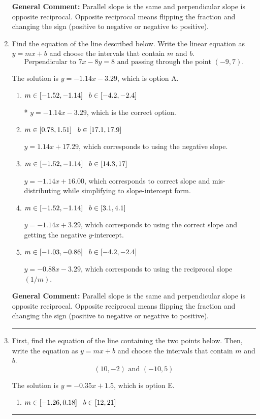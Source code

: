 \documentclass{extbook}[14pt]
\newcommand{\litem}[1]{\item #1

\rule{\textwidth}{0.4pt}}
\begin{document}
\begin{enumerate}
{\textbf{General Comment:} Parallel slope is the same and perpendicular slope is opposite reciprocal. Opposite reciprocal means flipping the fraction and changing the sign (positive to negative or negative to positive).
}
\litem{
Find the equation of the line described below. Write the linear equation as $ y=mx+b $ and choose the intervals that contain $m$ and $b$.
\[ \text{Perpendicular to } 7 x - 8 y = 8 \text{ and passing through the point } (-9, 7). \]

The solution is \( y = -1.14x - 3.29 \), which is option A.\begin{enumerate}[label=\Alph*.]
\item \( m \in [-1.52, -1.14] \hspace*{3mm} b \in [-4.2, -2.4] \)

* $y = -1.14x - 3.29$, which is the correct option.
\item \( m \in [0.78, 1.51] \hspace*{3mm} b \in [17.1, 17.9] \)

 $y = 1.14x + 17.29$, which corresponds to using the negative slope.
\item \( m \in [-1.52, -1.14] \hspace*{3mm} b \in [14.3, 17] \)

 $y = -1.14x + 16.00$, which corresponds to correct slope and mis-distributing while simplifying to slope-intercept form.
\item \( m \in [-1.52, -1.14] \hspace*{3mm} b \in [3.1, 4.1] \)

 $y = -1.14x + 3.29$, which corresponds to using the correct slope and getting the negative $y$-intercept.
\item \( m \in [-1.03, -0.86] \hspace*{3mm} b \in [-4.2, -2.4] \)

 $y = -0.88x - 3.29$, which corresponds to using the reciprocal slope $(1/m)$.
\end{enumerate}

\textbf{General Comment:} Parallel slope is the same and perpendicular slope is opposite reciprocal. Opposite reciprocal means flipping the fraction and changing the sign (positive to negative or negative to positive).
}
\litem{
First, find the equation of the line containing the two points below. Then, write the equation as $ y=mx+b $ and choose the intervals that contain $m$ and $b$.
\[ (10, -2) \text{ and } (-10, 5) \]

The solution is \( y = -0.35x + 1.5 \), which is option E.\begin{enumerate}[label=\Alph*.]
\item \( m \in [-1.26, 0.18] \hspace*{3mm} b \in [12, 21] \)


\end{enumerate}}
\end{enumerate}
\end{document}
